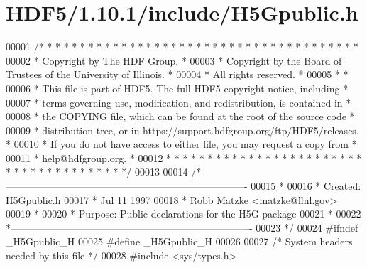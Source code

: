 \hypertarget{_h_d_f5_21_810_81_2include_2_h5_gpublic_8h_source}{}\section{H\+D\+F5/1.10.1/include/\+H5\+Gpublic.h}
\label{_h_d_f5_21_810_81_2include_2_h5_gpublic_8h_source}

\begin{DoxyCode}
00001 \textcolor{comment}{/* * * * * * * * * * * * * * * * * * * * * * * * * * * * * * * * * * * * * * *}
00002 \textcolor{comment}{ * Copyright by The HDF Group.                                               *}
00003 \textcolor{comment}{ * Copyright by the Board of Trustees of the University of Illinois.         *}
00004 \textcolor{comment}{ * All rights reserved.                                                      *}
00005 \textcolor{comment}{ *                                                                           *}
00006 \textcolor{comment}{ * This file is part of HDF5.  The full HDF5 copyright notice, including     *}
00007 \textcolor{comment}{ * terms governing use, modification, and redistribution, is contained in    *}
00008 \textcolor{comment}{ * the COPYING file, which can be found at the root of the source code       *}
00009 \textcolor{comment}{ * distribution tree, or in https://support.hdfgroup.org/ftp/HDF5/releases.  *}
00010 \textcolor{comment}{ * If you do not have access to either file, you may request a copy from     *}
00011 \textcolor{comment}{ * help@hdfgroup.org.                                                        *}
00012 \textcolor{comment}{ * * * * * * * * * * * * * * * * * * * * * * * * * * * * * * * * * * * * * * */}
00013 
00014 \textcolor{comment}{/*-------------------------------------------------------------------------}
00015 \textcolor{comment}{ *}
00016 \textcolor{comment}{ * Created:             H5Gpublic.h}
00017 \textcolor{comment}{ *                      Jul 11 1997}
00018 \textcolor{comment}{ *                      Robb Matzke <matzke@llnl.gov>}
00019 \textcolor{comment}{ *}
00020 \textcolor{comment}{ * Purpose:             Public declarations for the H5G package}
00021 \textcolor{comment}{ *}
00022 \textcolor{comment}{ *-------------------------------------------------------------------------}
00023 \textcolor{comment}{ */}
00024 \textcolor{preprocessor}{#ifndef \_H5Gpublic\_H}
00025 \textcolor{preprocessor}{#define \_H5Gpublic\_H}
00026 
00027 \textcolor{comment}{/* System headers needed by this file */}
00028 \textcolor{preprocessor}{#include <sys/types.h>}

\end{DoxyCode}
